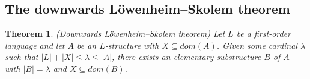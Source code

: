 \documentclass[10pt, a4paper, oneside]{article}
\newtheorem{thm}{Theorem}[section]
\theoremstyle{definition}
\theoremstyle{remark}
\theoremstyle{plain}
\begin{document}
\subsection{The downwards Löwenheim--Skolem theorem}

\begin{thm}
    (Downwards Löwenheim--Skolem theorem) Let $L$ be a first-order language and
    let $A$ be an $L$-structure with $X \subseteq dom(A)$. Given some cardinal
    $\lambda$ such that $|L| + |X| \leq \lambda \leq |A|$, there exists an
    elementary substructure $B$ of $A$ with $|B| = \lambda$ and
    $X \subseteq dom(B)$.
\end{thm}




\end{document}
